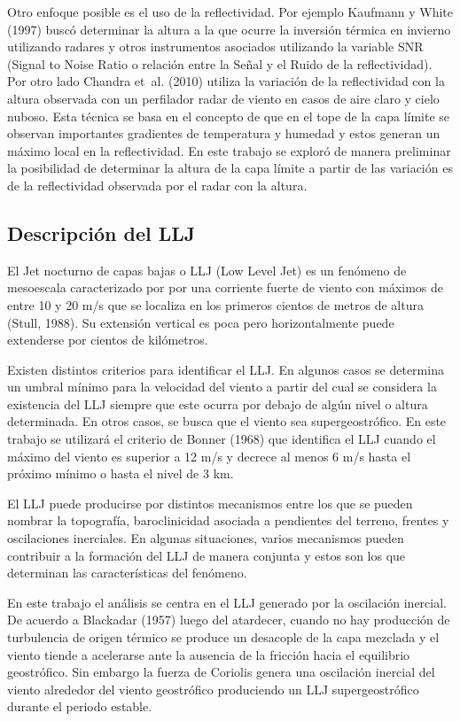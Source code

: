 \documentclass[12pt,spanish,oneside, a4paper]{book}
\begin{document}
Otro enfoque posible es el uso de la reflectividad. Por ejemplo Kaufmann
y White (1997) buscó determinar la altura a la que ocurre la inversión
térmica en invierno utilizando radares y otros instrumentos asociados
utilizando la variable SNR (Signal to Noise Ratio o relación entre la
Señal y el Ruido de la reflectividad). Por otro lado Chandra et~al.
(2010) utiliza la variación de la reflectividad con la altura observada
con un perfilador radar de viento en casos de aire claro y cielo nuboso.
Esta técnica se basa en el concepto de que en el tope de la capa límite
se observan importantes gradientes de temperatura y humedad y estos
generan un máximo local en la reflectividad. En este trabajo se exploró
de manera preliminar la posibilidad de determinar la altura de la capa
límite a partir de las variación es de la reflectividad observada por el
radar con la altura.

\subsection{Descripción del LLJ}\label{descripcion-del-llj}

El Jet nocturno de capas bajas o LLJ (Low Level Jet) es un fenómeno de
mesoescala caracterizado por por una corriente fuerte de viento con
máximos de entre 10 y 20 m/s que se localiza en los primeros cientos de
metros de altura (Stull, 1988). Su extensión vertical es poca pero
horizontalmente puede extenderse por cientos de kilómetros.

Existen distintos criterios para identificar el LLJ. En algunos casos se
determina un umbral mínimo para la velocidad del viento a partir del
cual se considera la existencia del LLJ siempre que este ocurra por
debajo de algún nivel o altura determinada. En otros casos, se busca que
el viento sea supergeostrófico. En este trabajo se utilizará el criterio
de Bonner (1968) que identifica el LLJ cuando el máximo del viento es
superior a 12 m/s y decrece al menos 6 m/s hasta el próximo mínimo o
hasta el nivel de 3 km.

El LLJ puede producirse por distintos mecanismos entre los que se pueden
nombrar la topografía, baroclinicidad asociada a pendientes del terreno,
frentes y oscilaciones inerciales. En algunas situaciones, varios
mecanismos pueden contribuir a la formación del LLJ de manera conjunta y
estos son los que determinan las características del fenómeno.

En este trabajo el análisis se centra en el LLJ generado por la
oscilación inercial. De acuerdo a Blackadar (1957) luego del atardecer,
cuando no hay producción de turbulencia de origen térmico se produce un
desacople de la capa mezclada y el viento tiende a acelerarse ante la
ausencia de la fricción hacia el equilibrio geostrófico. Sin embargo la
fuerza de Coriolis genera una oscilación inercial del viento alrededor
del viento geostrófico produciendo un LLJ supergeostrófico durante el
periodo estable.
\end{document}
